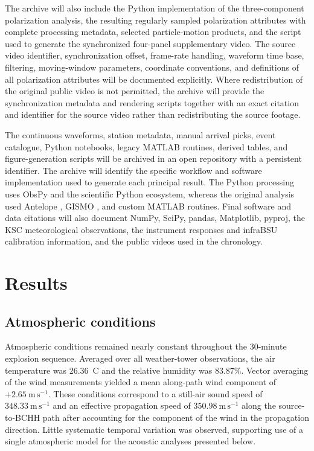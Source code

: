 \documentclass[]{seismica}
\begin{document}
The archive will also include the Python implementation of the
three-component polarization analysis, the resulting regularly sampled
polarization attributes with complete processing metadata, selected
particle-motion products, and the script used to generate the synchronized
four-panel supplementary video. The source video identifier, synchronization
offset, frame-rate handling, waveform time base, filtering, moving-window
parameters, coordinate conventions, and definitions of all polarization
attributes will be documented explicitly. Where redistribution of the original
public video is not permitted, the archive will provide the synchronization
metadata and rendering scripts together with an exact citation and identifier
for the source video rather than redistributing the source footage.

The continuous waveforms, station metadata, manual arrival picks, event catalogue, Python notebooks, legacy MATLAB routines, derived tables, and figure-generation scripts will be archived in an open repository with a persistent identifier. The archive will identify the specific workflow and software implementation used to generate each principal result. The Python processing uses ObsPy \citep{beyreuther_obspy_2010,krischer_obspy_2015}
and the scientific Python ecosystem, whereas the original analysis used
Antelope \citep{brtt_antelope}, GISMO \citep{thompson_gismo_2017}, and custom
MATLAB routines. Final software and data citations will also document NumPy,
SciPy, pandas, Matplotlib, pyproj, the KSC meteorological observations, the
instrument responses and infraBSU calibration information, and the public
videos used in the chronology.

\section{Results}
\label{sec:results}

\subsection{Atmospheric conditions}
\label{sec:results_atmosphere}

Atmospheric conditions remained nearly constant throughout the 30-minute explosion sequence. Averaged over all weather-tower observations, the air temperature was 26.36~\textdegree C and the relative humidity was 83.87\%. Vector averaging of the wind measurements yielded a mean along-path wind component of $+2.65~\mathrm{m\,s^{-1}}$. These conditions correspond to a still-air sound speed of $348.33~\mathrm{m\,s^{-1}}$ and an effective propagation speed of $350.98~\mathrm{m\,s^{-1}}$ along the source-to-BCHH path after accounting for the component of the wind in the propagation direction. Little systematic temporal variation was observed, supporting use of a single atmospheric model for the acoustic analyses presented below.
\end{document}
